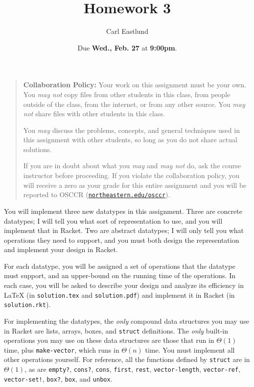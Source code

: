 \documentclass{article}
\title{Homework 3}
\author{Carl Eastlund}
\date{Due \textbf{Wed., Feb. 27} at \textbf{9:00pm}.}
\begin{document}
\maketitle

\newcommand\link[2][http://]{\href{#1#2}{\nolinkurl{#2}}}
\newcommand\http[1]{\link[http://]{#1}}
\newcommand\https[1]{\link[https://]{#1}}
\newcommand\email[1]{\link[mailto:]{#1}}

\begin{quotation}

  \noindent \textbf{Collaboration Policy:} Your work on this assignment must be
  your own.  You \emph{may not} copy files from other students in this class,
  from people outside of the class, from the internet, or from any other source.
  You \emph{may not} share files with other students in this class.

  \medskip

  \noindent You \emph{may} discuss the problems, concepts, and general
  techniques used in this assignment with other students, so long as you do not
  share actual solutions.

  \medskip

  \noindent If you are in doubt about what you \emph{may} and \emph{may not} do,
  ask the course instructor before proceeding.  If you violate the collaboration
  policy, you will receive a zero as your grade for this entire assignment and
  you will be reported to OSCCR (\link{northeastern.edu/osccr}).

\end{quotation}

\bigskip

\newcommand\file\texttt
\newcommand\code\texttt
\newcommand\?{\mbox{\code{?}}}

You will implement three new datatypes in this assignment.  Three are concrete
datatypes; I will tell you what sort of representation to use, and you will
implement that in Racket.  Two are abstract datatypes; I will only tell you what
operations they need to support, and you must both design the representation and
implement your design in Racket.

For each datatype, you will be assigned a set of operations that the datatype
must support, and an upper-bound on the running time of the operations.  In each
case, you will be asked to describe your design and analyze its efficiency in
\LaTeX{} (in \file{solution.tex} and \file{solution.pdf}) and implement it in
Racket (in \file{solution.rkt}).

For implementing the datatypes, the \emph{only} compound data structures you may
use in Racket are lists, arrays, boxes, and \code{struct} definitions.  The
\emph{only} built-in operations you may use on these data structures are those
that run in \(\Theta(1)\) time, plus \code{make-vector}, which runs in
\(\Theta(n)\) time.  You must implement all other operations yourself.  For
reference, all the functions defined by \code{struct} are in \(\Theta(1)\), as
are \code{empty\?}, \code{cons\?}, \code{cons}, \code{first}, \code{rest},
\code{vector-length}, \code{vector-ref}, \code{vector-set!}, \code{box\?},
\code{box}, and \code{unbox}.
\end{document}
